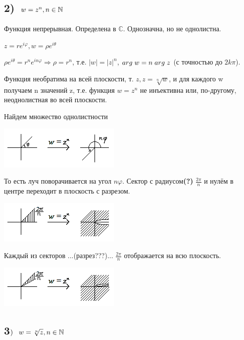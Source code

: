 \documentclass[a4paper, 12pt]{report}
\begin{document}
\subsection*{2)$\hspace{3 mm} w = z^n, n\in \mathbb{N} $}

Функция непрерывная. Определена в $\mathbb{C} $. Однозначна, но не однолистна. 

$z = re^{i\varphi }, w = \rho e^{i\theta }$

$\rho e^{i\theta } = r^ne^{in\varphi }\Rightarrow \rho = r^n$, т.е. $\left\lvert w \right\rvert = \left\lvert z \right\rvert^n  $, $arg\hspace{1 mm}w = n\hspace{1 mm} arg\hspace{1 mm}z$ (с точностью до $2k\pi $).

Функция необратима на всей плоскости, т. $z, z = \sqrt[n]{w} $, и для каждого w получаем n значений z, т.е. функция $w = z^n$ не инъективна или, по-другому, неоднолистная во всей плоскости. 

Найдем множество однолистности 

\includegraphics{5-6/4io.png}

То есть луч поворачивается на угол $n\varphi $. Сектор с радиусом\textbf{(?)} $\frac{2\pi }{n} $ и нулём в центре переходит в плоскость с разрезом. 

\includegraphics{5-6/5io.png}

Каждый из секторов ...(разрез???)... $\frac{2\pi }{n} $ отображается на всю плоскость.

\includegraphics{5-6/6io.png}

\subsection*{3$)\hspace{3 mm} w = \sqrt[n]{z} , n\in \mathbb{N} $}
\end{document}
